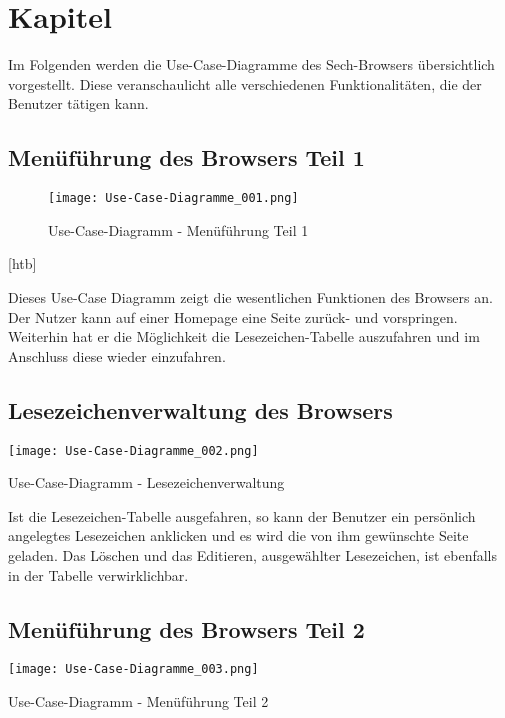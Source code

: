 
\chapter{Kapitel}

Im Folgenden werden die Use-Case-Diagramme des Sech-Browsers übersichtlich vorgestellt. Diese veranschaulicht alle verschiedenen Funktionalitäten, die der Benutzer tätigen kann.

\section{Menüführung des Browsers Teil 1}

\begin{figure}[htb]
\texttt{[image: Use-Case-Diagramme\_001.png]}
	\caption{Use-Case-Diagramm - Menüführung Teil 1}
	\label{fig:Menüführung Teil 1}
\end{figure}[htb]
	
Dieses Use-Case Diagramm zeigt die wesentlichen Funktionen des Browsers an. Der Nutzer kann auf einer Homepage eine Seite zurück- und vorspringen. Weiterhin hat er die Möglichkeit die Lesezeichen-Tabelle auszufahren und im Anschluss diese wieder einzufahren.

\section{Lesezeichenverwaltung des Browsers}

\texttt{[image: Use-Case-Diagramme\_002.png]}
	\caption{Use-Case-Diagramm - Lesezeichenverwaltung}
	\label{fig:Lesezeichenverwaltung}

Ist die Lesezeichen-Tabelle ausgefahren, so kann der Benutzer ein persönlich angelegtes Lesezeichen anklicken und es wird die von ihm gewünschte Seite geladen. Das Löschen und das Editieren, ausgewählter Lesezeichen, ist ebenfalls in der Tabelle verwirklichbar.

\section{Menüführung des Browsers Teil 2}

\texttt{[image: Use-Case-Diagramme\_003.png]}
	\caption{Use-Case-Diagramm - Menüführung Teil 2}
	\label{fig:Menüführung Teil 2}

